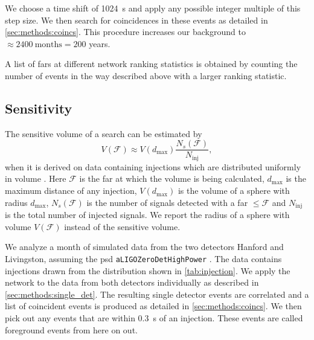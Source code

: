 We choose a time shift of \SI{1024}{\second} and apply any possible integer multiple of this step size. We then search for coincidences in these events as detailed in \autoref{sec:methods:coincs}. This procedure increases our background to $\approx 2400\ \text{months} = 200$ years.

A list of \acrshort{far}s at different network ranking statistics is obtained by counting the number of events in the way described above with a larger ranking statistic.

\subsection{Sensitivity}
The sensitive volume of a search can be estimated by
\begin{equation}\label{eq:sens_vol}
    V\left(\mathcal{F}\right) \approx V\left(d_\text{max}\right)\frac{N_s\left(\mathcal{F}\right)}{N_\text{inj}},
\end{equation}
when it is derived on data containing injections which are distributed uniformly in volume \cite{Usman:2015kfa}. Here $\mathcal{F}$ is the \acrshort{far} at which the volume is being calculated, $d_\text{max}$ is the maximum distance of any injection, $V\left(d_\text{max}\right)$ is the volume of a sphere with radius $d_\text{max}$, $N_s\left(\mathcal{F}\right)$ is the number of signals detected with a \acrshort{far} $\leq\mathcal{F}$ and $N_\text{inj}$ is the total number of injected signals. We report the radius of a sphere with volume $V\left(\mathcal{F}\right)$ instead of the sensitive volume.

We analyze a month of simulated data from the two detectors Hanford and Livingston, assuming the \acrshort{psd} \verb|aLIGOZeroDetHighPower| \cite{lalsuite}. The data contains injections drawn from the distribution shown in \autoref{tab:injection}. We apply the network to the data from both detectors individually as described in \autoref{sec:methods:single_det}. The resulting single detector events are correlated and a list of coincident events is produced as detailed in \autoref{sec:methods:coincs}. We then pick out any events that are within \SI{0.3}{\second} of an injection. These events are called foreground events from here on out.

